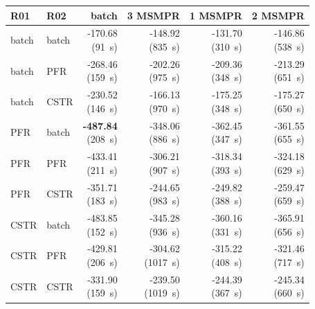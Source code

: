 \begin{tabular}{@{}llrrrr@{}}\toprule
R01 & R02 & batch & 3 MSMPR & 1 MSMPR & 2 MSMPR\\\midrule
batch & batch & \makecell{-170.68\\(91~s)} & \makecell{-148.92\\(835~s)} & \makecell{-131.70\\(310~s)} & \makecell{-146.86\\(538~s)} \\
batch & PFR & \makecell{-268.46\\(159~s)} & \makecell{-202.26\\(975~s)} & \makecell{-209.36\\(348~s)} & \makecell{-213.29\\(651~s)} \\
batch & CSTR & \makecell{-230.52\\(146~s)} & \makecell{-166.13\\(970~s)} & \makecell{-175.25\\(348~s)} & \makecell{-175.27\\(650~s)} \\
PFR & batch & \makecell{\textbf{-487.84}\\(208~s)} & \makecell{-348.06\\(886~s)} & \makecell{-362.45\\(347~s)} & \makecell{-361.55\\(655~s)} \\
PFR & PFR & \makecell{-433.41\\(211~s)} & \makecell{-306.21\\(907~s)} & \makecell{-318.34\\(393~s)} & \makecell{-324.18\\(629~s)} \\
PFR & CSTR & \makecell{-351.71\\(183~s)} & \makecell{-244.65\\(983~s)} & \makecell{-249.82\\(388~s)} & \makecell{-259.47\\(659~s)} \\
CSTR & batch & \makecell{-483.85\\(152~s)} & \makecell{-345.28\\(936~s)} & \makecell{-360.16\\(331~s)} & \makecell{-365.91\\(656~s)} \\
CSTR & PFR & \makecell{-429.81\\(206~s)} & \makecell{-304.62\\(1017~s)} & \makecell{-315.22\\(408~s)} & \makecell{-321.46\\(717~s)} \\
CSTR & CSTR & \makecell{-331.90\\(159~s)} & \makecell{-239.50\\(1019~s)} & \makecell{-244.39\\(367~s)} & \makecell{-245.34\\(660~s)} \\
\bottomrule\end{tabular}
